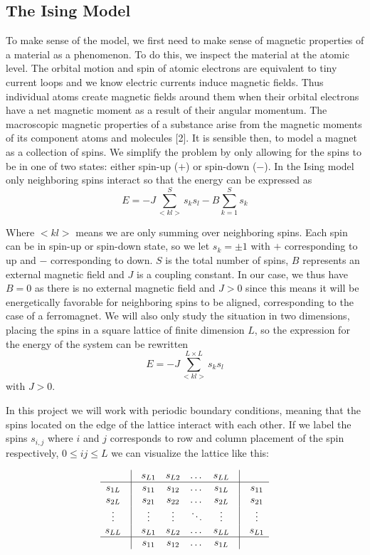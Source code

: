 \documentclass[english, 12pt]{article}
\begin{document}
\subsection{The Ising Model}
To make sense of the model, we first need to make sense of magnetic properties of a material as a phenomenon. To do this, we inspect the material at the atomic level. The orbital motion and spin of atomic electrons are equivalent to tiny current loops and we know electric currents induce magnetic fields. Thus individual atoms create magnetic fields around them when their orbital electrons have a net magnetic moment as a result of their angular momentum. The macroscopic magnetic properties of a substance arise from the magnetic moments of its component atoms and molecules [2].
It is sensible then, to model a magnet as a collection of spins. We simplify the problem by only allowing for the spins to be in one of two states: either spin-up ($+$) or spin-down ($-$).
In the Ising model only neighboring spins interact so that the energy can be expressed as
$$E = -J\sum\limits_{<kl>}^Ss_ks_l - B\sum_{k=1}^{S}s_k$$

Where $<kl>$ means we are only summing over neighboring spins. Each spin can be in spin-up or spin-down state, so we let $s_k=\pm1$ with $+$ corresponding to up and $-$ corresponding to down. $S$ is the total number of spins, $B$ represents an external magnetic field and $J$ is a coupling constant. In our case, we thus have $B=0$ as there is no external magnetic field and $J>0$ since this means it will be energetically favorable for neighboring spins to be aligned, corresponding to the case of a ferromagnet. We will also only study the situation in two dimensions, placing the spins in a square lattice of finite dimension $L$, so the expression for the energy of the system can be rewritten
$$E = -J\sum\limits_{<kl>}^{L\times L}s_ks_l$$ with $J>0$.

In this project we will work with periodic boundary conditions, meaning that the spins located on the edge of the lattice interact with each other. If we label the spins $s_{i,j}$ where $i$ and $j$ corresponds to row and column placement of the spin respectively, $0\leq ij\leq L$ we can visualize the lattice like this:

$$\begin{matrix} & \vline &  s_{L1}  & s_{L2} & \dots & s_{LL}& \vline & \\ \hline
s_{1L} & \vline & s_{11} & s_{12} & \dots & s_{1L}& \vline & s_{11}\\
s_{2L} & \vline & s_{21} & s_{22} & \dots & s_{2L} & \vline & s_{21} \\
\vdots & \vline & \vdots & \vdots & \ddots & \vdots & \vline & \vdots \\
s_{LL} & \vline & s_{L1} & s_{L2} & \dots & s_{LL}& \vline & s_{L1} \\ \hline
 & \vline & s_{11} & s_{12} & \dots & s_{1L} & \vline & \end{matrix}$$
\end{document}
